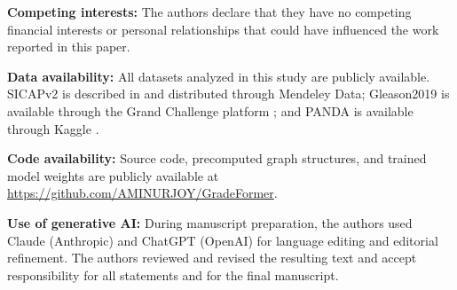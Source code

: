 \documentclass[11pt,a4paper]{article}
\begin{document}
\textbf{Competing interests:} The authors declare that they have no competing financial interests or personal relationships that could have influenced the work reported in this paper.

\textbf{Data availability:} All datasets analyzed in this study are publicly available. SICAPv2 is described in \cite{ref12} and distributed through Mendeley Data; Gleason2019 is available through the Grand Challenge platform \cite{ref5}; and PANDA is available through Kaggle \cite{ref6}.

\textbf{Code availability:} Source code, precomputed graph structures, and trained model weights are publicly available at \url{https://github.com/AMINURJOY/GradeFormer}.

\textbf{Use of generative AI:} During manuscript preparation, the authors used Claude (Anthropic) and ChatGPT (OpenAI) for language editing and editorial refinement. The authors reviewed and revised the resulting text and accept responsibility for all statements and for the final manuscript.




\end{document}
